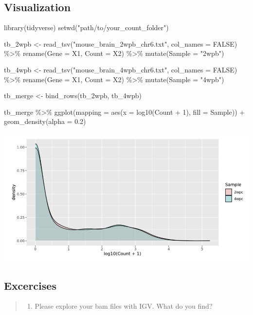 \documentclass[
]{book}
\newenvironment{Shaded}{\begin{snugshade}}{\end{snugshade}}
\newcommand{\NormalTok}[1]{#1}
\providecommand{\tightlist}{%
  \setlength{\itemsep}{0pt}\setlength{\parskip}{0pt}}
\begin{document}
\hypertarget{visualization-2}{%
\subsection{Visualization}\label{visualization-2}}

\begin{Shaded}
\begin{Highlighting}[]

\NormalTok{library(tidyverse)}
\NormalTok{setwd("path/to/your\_count\_folder")}


\NormalTok{tb\_2wpb \textless{}{-} read\_tsv("mouse\_brain\_2wpb\_chr6.txt", col\_names = FALSE) \%\textgreater{}\% }
\NormalTok{  rename(Gene = X1, Count = X2) \%\textgreater{}\% }
\NormalTok{  mutate(Sample = "2wpb")}

\NormalTok{tb\_4wpb \textless{}{-} read\_tsv("mouse\_brain\_4wpb\_chr6.txt", col\_names = FALSE) \%\textgreater{}\% }
\NormalTok{  rename(Gene = X1, Count = X2) \%\textgreater{}\%}
\NormalTok{  mutate(Sample = "4wpb")}

\NormalTok{tb\_merge \textless{}{-} bind\_rows(tb\_2wpb, tb\_4wpb)}

\NormalTok{tb\_merge \%\textgreater{}\% ggplot(mapping = aes(x = log10(Count + 1), fill = Sample)) +}
\NormalTok{  geom\_density(alpha = 0.2)}
\end{Highlighting}
\end{Shaded}

\includegraphics{figures/count_distribution.png}

\hypertarget{excercises}{%
\subsection{Excercises}\label{excercises}}

\begin{quote}
\begin{enumerate}
\def\labelenumi{\arabic{enumi}.}
\tightlist
\item
  Please explore your bam files with IGV. What do you find?
\end{enumerate}
\end{quote}
\end{document}
